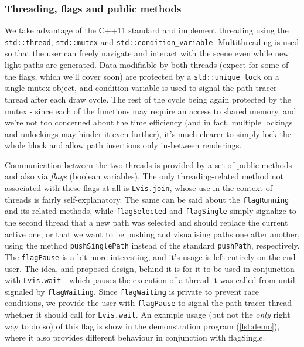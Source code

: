 \subsubsection{Threading, flags and public methods}

We take advantage of the C++11 standard and implement threading using the \texttt{std::thread}, \texttt{std::mutex} and \texttt{std::condition\_variable}. Multithreading is used so that the user can freely navigate and interact with the scene even while new light paths are generated. Data modifiable by both threads (expect for some of the flags, which we'll cover soon) are protected by a \texttt{std::unique\_lock} on a single mutex object, and condition variable is used to signal the path tracer thread after each draw cycle. The rest of the cycle being again protected by the mutex - since each of the functions may require an access to shared memory, and we're not too concerned about the time efficiency (and in fact, multiple lockings and unlockings may hinder it even further), it's much clearer to simply lock the whole block and allow path insertions only in-between renderings.

Communication between the two threads is provided by a set of public methods and also via \emph{flags} (boolean variables). The only threading-related method not associated with these flags at all is \texttt{Lvis.join}, whose use in the context of threads is fairly self-explanatory. The same can be said about the \texttt{flagRunning} and its related methods, while \texttt{flagSelected} and \texttt{flagSingle} simply signalize to the second thread that a new path was selected and should replace the current active one, or that we want to be pushing and visualising paths one after another, using the method \texttt{pushSinglePath} instead of the standard \texttt{pushPath}, respectively. The \texttt{flagPause} is a bit more interesting, and it's usage is left entirely on the end user. The idea, and proposed design, behind it is for it to be used in conjunction with \texttt{Lvis.wait} - which pauses the execution of a thread it was called from until signaled by \texttt{flagWaiting}. Since \texttt{flagWaiting} is private to prevent race conditions, we provide the user with \texttt{flagPause} to signal the path tracer thread whether it should call for \texttt{Lvis.wait}. An example usage (but not the \emph{only} right way to do so) of this flag is show in the demonstration program (\ref{lst:demo}), where it also provides different behaviour in conjunction with flagSingle. 

